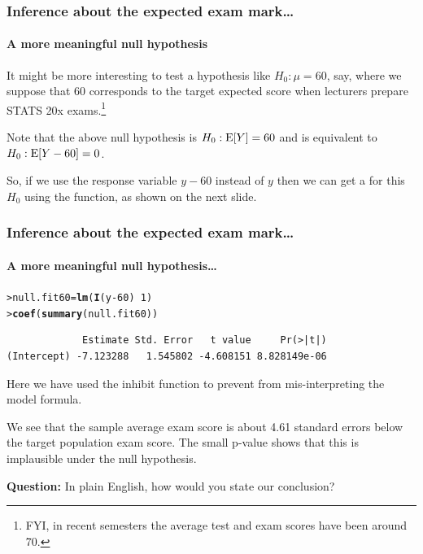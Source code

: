\documentclass{beamer}\usepackage[]{graphicx}\usepackage[]{xcolor}
\makeatletter
\newcommand{\hlnum}[1]{\textcolor[rgb]{0.686,0.059,0.569}{#1}}%
\newcommand{\hlopt}[1]{\textcolor[rgb]{0,0,0}{#1}}%
\newcommand{\hlstd}[1]{\textcolor[rgb]{0.345,0.345,0.345}{#1}}%
\newcommand{\hlkwb}[1]{\textcolor[rgb]{0.69,0.353,0.396}{#1}}%
\newcommand{\hlkwd}[1]{\textcolor[rgb]{0.737,0.353,0.396}{\textbf{#1}}}%
\newenvironment{kframe}{%
 \def\at@end@of@kframe{}%
 \ifinner\ifhmode%
  \def\at@end@of@kframe{\end{minipage}}%
  \begin{minipage}{\columnwidth}%
 \fi\fi%
 \def\FrameCommand##1{\hskip\@totalleftmargin \hskip-\fboxsep
 \colorbox{shadecolor}{##1}\hskip-\fboxsep
     \hskip-\linewidth \hskip-\@totalleftmargin \hskip\columnwidth}%
 \MakeFramed {\advance\hsize-\width
   \@totalleftmargin\z@ \linewidth\hsize
   \@setminipage}}%
 {\par\unskip\endMakeFramed%
 \at@end@of@kframe}
\newenvironment{knitrout}{}{} %
\makeatother
\begin{document}
\begin{frame}
\frametitle{Inference about the expected exam mark\ldots}
\framesubtitle{A more meaningful null hypothesis}

It might be more interesting to test a hypothesis like $H_0: \mu = 60$, say, where we suppose that 60 corresponds to the target expected score when lecturers prepare STATS 20x exams.\footnote{FYI, in recent semesters the average test and exam scores have been around 70.}

Note that the above null hypothesis is $H_0: \operatorname{E}[Y] = 60$ and is equivalent to $H_0: \operatorname{E}[Y-60] = 0$.

So, if we use the response variable $y-60$ instead of $y$ then we can get a \pval{} for this $H_0$ using the  function, as shown on the next slide.
\end{frame}


\begin{frame}[fragile]
\frametitle{Inference about the expected exam mark\ldots}
\framesubtitle{A more meaningful null hypothesis\ldots}

\begin{knitrout}\scriptsize
{}\color{fgcolor}\begin{kframe}
\begin{alltt}
\hlstd{> }\hlstd{null.fit60}\hlkwb{=}\hlkwd{lm}\hlstd{(}\hlkwd{I}\hlstd{(y}\hlopt{-}\hlnum{60}\hlstd{)}\hlopt{~}\hlnum{1}\hlstd{)}
\hlstd{> }\hlkwd{coef}\hlstd{(}\hlkwd{summary}\hlstd{(null.fit60))}
\end{alltt}
\begin{verbatim}
             Estimate Std. Error   t value     Pr(>|t|)
(Intercept) -7.123288   1.545802 -4.608151 8.828149e-06
\end{verbatim}
\end{kframe}
\end{knitrout}

Here we have used the inhibit function  to prevent  from mis-interpreting the model formula.
\bigskip

We see that the sample average exam score is about 4.61 standard errors below the target population exam score. The small p-value shows that this is implausible under the null hypothesis.
\bigskip

{\bf Question:} In plain English, how would you state our conclusion?

\end{frame}
\end{document}

